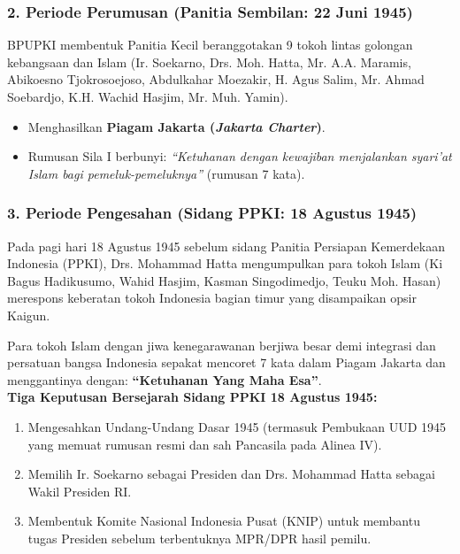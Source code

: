 \documentclass[10pt,a4paper]{article}
\begin{document}
\subsubsection{2. Periode Perumusan (Panitia Sembilan: 22 Juni 1945)}
BPUPKI membentuk Panitia Kecil beranggotakan 9 tokoh lintas golongan kebangsaan dan Islam (Ir. Soekarno, Drs. Moh. Hatta, Mr. A.A. Maramis, Abikoesno Tjokrosoejoso, Abdulkahar Moezakir, H. Agus Salim, Mr. Ahmad Soebardjo, K.H. Wachid Hasjim, Mr. Muh. Yamin).
\begin{itemize}
  \item Menghasilkan \textbf{Piagam Jakarta (\textit{Jakarta Charter})}.
  \item Rumusan Sila I berbunyi: \textit{``Ketuhanan dengan kewajiban menjalankan syari'at Islam bagi pemeluk-pemeluknya''} (rumusan 7 kata).
\end{itemize}

\subsubsection{3. Periode Pengesahan (Sidang PPKI: 18 Agustus 1945)}
Pada pagi hari 18 Agustus 1945 sebelum sidang Panitia Persiapan Kemerdekaan Indonesia (PPKI), Drs. Mohammad Hatta mengumpulkan para tokoh Islam (Ki Bagus Hadikusumo, Wahid Hasjim, Kasman Singodimedjo, Teuku Moh. Hasan) merespons keberatan tokoh Indonesia bagian timur yang disampaikan opsir Kaigun.
\begin{conceptbox}
Para tokoh Islam dengan jiwa kenegarawanan berjiwa besar demi integrasi dan persatuan bangsa Indonesia sepakat mencoret 7 kata dalam Piagam Jakarta dan menggantinya dengan: \textbf{``Ketuhanan Yang Maha Esa''}.\\
\textbf{Tiga Keputusan Bersejarah Sidang PPKI 18 Agustus 1945:}
\begin{enumerate}
  \item Mengesahkan Undang-Undang Dasar 1945 (termasuk Pembukaan UUD 1945 yang memuat rumusan resmi dan sah Pancasila pada Alinea IV).
  \item Memilih Ir. Soekarno sebagai Presiden dan Drs. Mohammad Hatta sebagai Wakil Presiden RI.
  \item Membentuk Komite Nasional Indonesia Pusat (KNIP) untuk membantu tugas Presiden sebelum terbentuknya MPR/DPR hasil pemilu.
\end{enumerate}
\end{conceptbox}
\end{document}
